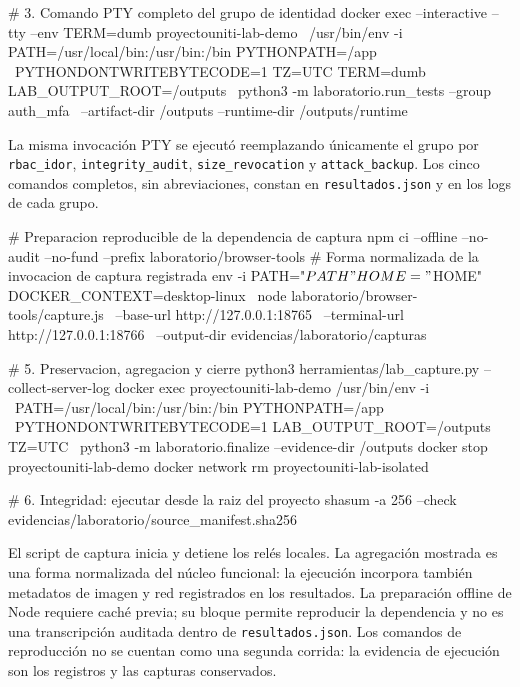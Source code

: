 \documentclass[10pt,a4paper]{article}
\newcommand{\archivo}[1]{{\ttfamily\nolinkurl{#1}}}
\begin{document}
\begin{CodigoTerminal}
# 3. Comando PTY completo del grupo de identidad
docker exec --interactive --tty --env TERM=dumb proyectouniti-lab-demo \
  /usr/bin/env -i PATH=/usr/local/bin:/usr/bin:/bin PYTHONPATH=/app \
  PYTHONDONTWRITEBYTECODE=1 TZ=UTC TERM=dumb LAB_OUTPUT_ROOT=/outputs \
  python3 -m laboratorio.run_tests --group auth_mfa \
  --artifact-dir /outputs --runtime-dir /outputs/runtime
\end{CodigoTerminal}
La misma invocación PTY se ejecutó reemplazando únicamente el grupo por \archivo{rbac_idor}, \archivo{integrity_audit}, \archivo{size_revocation} y \archivo{attack_backup}. Los cinco comandos completos, sin abreviaciones, constan en \archivo{resultados.json} y en los logs de cada grupo.

\begin{CodigoTerminal}
# Preparacion reproducible de la dependencia de captura
npm ci --offline --no-audit --no-fund --prefix laboratorio/browser-tools
# Forma normalizada de la invocacion de captura registrada
env -i PATH="$PATH" HOME="$HOME" DOCKER_CONTEXT=desktop-linux \
  node laboratorio/browser-tools/capture.js \
  --base-url http://127.0.0.1:18765 \
  --terminal-url http://127.0.0.1:18766 \
  --output-dir evidencias/laboratorio/capturas

# 5. Preservacion, agregacion y cierre
python3 herramientas/lab_capture.py --collect-server-log
docker exec proyectouniti-lab-demo /usr/bin/env -i \
  PATH=/usr/local/bin:/usr/bin:/bin PYTHONPATH=/app \
  PYTHONDONTWRITEBYTECODE=1 LAB_OUTPUT_ROOT=/outputs TZ=UTC \
  python3 -m laboratorio.finalize --evidence-dir /outputs
docker stop proyectouniti-lab-demo
docker network rm proyectouniti-lab-isolated

# 6. Integridad: ejecutar desde la raiz del proyecto
shasum -a 256 --check evidencias/laboratorio/source_manifest.sha256
\end{CodigoTerminal}
El script de captura inicia y detiene los relés locales. La agregación mostrada es una forma normalizada del núcleo funcional: la ejecución incorpora también metadatos de imagen y red registrados en los resultados. La preparación offline de Node requiere caché previa; su bloque permite reproducir la dependencia y no es una transcripción auditada dentro de \archivo{resultados.json}. Los comandos de reproducción no se cuentan como una segunda corrida: la evidencia de ejecución son los registros y las capturas conservados.
\end{document}
